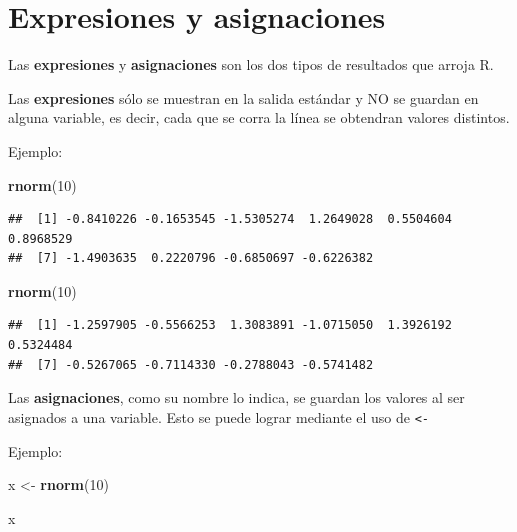 \documentclass[
]{book}
\newenvironment{Shaded}{\begin{snugshade}}{\end{snugshade}}
\newcommand{\DecValTok}[1]{\textcolor[rgb]{0.00,0.00,0.81}{#1}}
\newcommand{\FunctionTok}[1]{\textcolor[rgb]{0.13,0.29,0.53}{\textbf{#1}}}
\newcommand{\NormalTok}[1]{#1}
\newcommand{\OtherTok}[1]{\textcolor[rgb]{0.56,0.35,0.01}{#1}}
\begin{document}
\section{Expresiones y asignaciones}\label{expresiones-y-asignaciones}

Las \textbf{expresiones} y \textbf{asignaciones} son los dos tipos de resultados que arroja R.

Las \textbf{expresiones} sólo se muestran en la salida estándar y NO se guardan en alguna variable, es decir, cada que se corra la línea se obtendran valores distintos.

Ejemplo:

\begin{Shaded}
\begin{Highlighting}[]
\FunctionTok{rnorm}\NormalTok{(}\DecValTok{10}\NormalTok{)}
\end{Highlighting}
\end{Shaded}

\begin{verbatim}
##  [1] -0.8410226 -0.1653545 -1.5305274  1.2649028  0.5504604  0.8968529
##  [7] -1.4903635  0.2220796 -0.6850697 -0.6226382
\end{verbatim}

\begin{Shaded}
\begin{Highlighting}[]
\FunctionTok{rnorm}\NormalTok{(}\DecValTok{10}\NormalTok{)}
\end{Highlighting}
\end{Shaded}

\begin{verbatim}
##  [1] -1.2597905 -0.5566253  1.3083891 -1.0715050  1.3926192  0.5324484
##  [7] -0.5267065 -0.7114330 -0.2788043 -0.5741482
\end{verbatim}

Las \textbf{asignaciones}, como su nombre lo indica, se guardan los valores al ser asignados a una variable. Esto se puede lograr mediante el uso de \texttt{\textless{}-}

Ejemplo:

\begin{Shaded}
\begin{Highlighting}[]
\NormalTok{x }\OtherTok{\textless{}{-}} \FunctionTok{rnorm}\NormalTok{(}\DecValTok{10}\NormalTok{)}
\end{Highlighting}
\end{Shaded}

\begin{Shaded}
\begin{Highlighting}[]
\NormalTok{x}
\end{Highlighting}
\end{Shaded}
\end{document}
